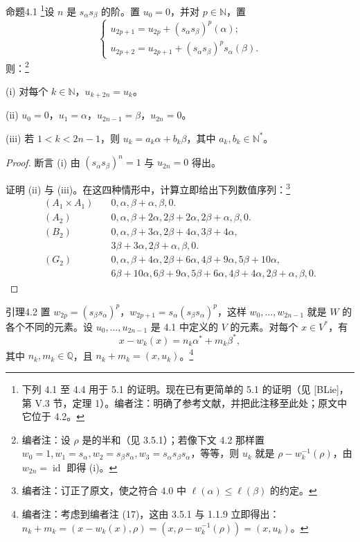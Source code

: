 \begin{SGAresult}{命题}{4.1}
\begingroup\renewcommand{\thefootnote}{*}\footnote[0]{下列 4.1 至 4.4 用于 5.1 的证明。现在已有更简单的 5.1 的证明（见 [BLie]，第 V.3 节，定理 1）。编者注：明确了参考文献，并把此注移至此处；原文中它位于 4.2。}\endgroup 设 $n$ 是 $s_\alpha s_\beta$ 的阶。置 $u_0=0$，并对 $p\in\mathbb N$，置
\[
\begin{cases}
u_{2p+1}=u_{2p}+(s_\alpha s_\beta)^p(\alpha);\\
u_{2p+2}=u_{2p+1}+(s_\alpha s_\beta)^ps_\alpha(\beta).
\end{cases}
\]
则：\footnote{编者注：设 $\rho$ 是的半和（见 3.5.1）；若像下文 4.2 那样置 $w_0=1,w_1=s_\alpha,w_2=s_\beta s_\alpha,w_3=s_\alpha s_\beta s_\alpha$，等等，则 $u_k$ 就是 $\rho-w_k^{-1}(\rho)$，由 $w_{2n}=\operatorname{id}$ 即得 (i)。}

(i) 对每个 $k\in\mathbb N$，$u_{k+2n}=u_k$。

(ii) $u_0=0$，$u_1=\alpha$，$u_{2n-1}=\beta$，$u_{2n}=0$。

(iii) 若 $1<k<2n-1$，则 $u_k=a_k\alpha+b_k\beta$，其中 $a_k,b_k\in\mathbb N^*$。
\end{SGAresult}
\begin{proof}
断言 (i) 由 $(s_\alpha s_\beta)^n=1$ 与 $u_{2n}=0$ 得出。

证明 (ii) 与 (iii)。在这四种情形中，计算立即给出下列数值序列：\footnote{编者注：订正了原文，使之符合 4.0 中 $\ell(\alpha)\leq\ell(\beta)$ 的约定。}
\begin{align*}
(A_1\times A_1)\quad&0,\alpha,\beta+\alpha,\beta,0.\\[2pt]
(A_2)\quad&0,\alpha,\beta+2\alpha,2\beta+2\alpha,2\beta+\alpha,\beta,0.\\[2pt]
(B_2)\quad&0,\alpha,\beta+3\alpha,2\beta+4\alpha,3\beta+4\alpha,\\
&3\beta+3\alpha,2\beta+\alpha,\beta,0.\\[2pt]
(G_2)\quad&0,\alpha,\beta+4\alpha,2\beta+6\alpha,4\beta+9\alpha,5\beta+10\alpha,\\
&6\beta+10\alpha,6\beta+9\alpha,5\beta+6\alpha,4\beta+4\alpha,2\beta+\alpha,\beta,0.
\end{align*}
\end{proof}
\begin{SGAresult}{引理}{4.2}
置 $w_{2p}=(s_\beta s_\alpha)^p$，$w_{2p+1}=s_\alpha(s_\beta s_\alpha)^p$，这样 $w_0,\ldots,w_{2n-1}$ 就是 $W$ 的各个不同的元素。设 $u_0,\ldots,u_{2n-1}$ 是 4.1 中定义的 $V$ 的元素。对每个 $x\in V^*$，有
\[x-w_k(x)=n_k\alpha^*+m_k\beta^*,\]
其中 $n_k,m_k\in\mathbb Q$，且 $n_k+m_k=(x,u_k)$。\footnote{编者注：考虑到编者注 (17)，这由 3.5.1 与 1.1.9 立即得出：$n_k+m_k=(x-w_k(x),\rho)=(x,\rho-w_k^{-1}(\rho))=(x,u_k)$。}
\end{SGAresult}
